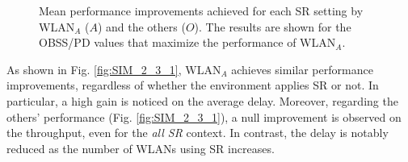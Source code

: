\documentclass[comsoc]{IEEEtran}
\begin{document}
	\begin{figure}[ht!]
		\centering		
		\caption{Mean performance improvements achieved for each SR setting by WLAN$_A$ ($A$) and the others ($O$). The results are shown for the OBSS/PD values that maximize the performance of WLAN$_A$.}\label{fig:SIM_2_3}
	\end{figure}
	
	As shown in Fig. \ref{fig:SIM_2_3_1}, $\text{WLAN}_A$ achieves similar performance improvements, regardless of whether the environment applies SR or not. In particular, a high gain is noticed on the average delay. Moreover, regarding the others' performance (Fig. \ref{fig:SIM_2_3_1}), a null improvement is observed on the throughput, even for the \emph{all SR} context. In contrast, the delay is notably reduced as the number of WLANs using SR increases.
	
\end{document}

